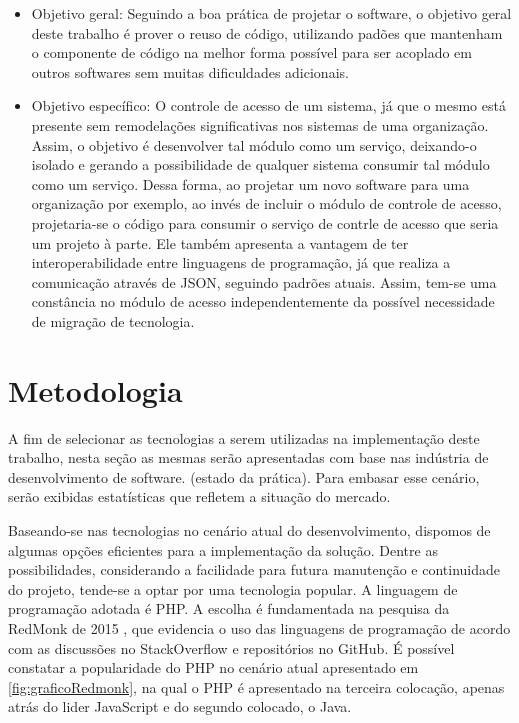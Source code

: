 \begin{itemize}
	\item Objetivo geral: Seguindo a boa prática de projetar o software, o objetivo geral deste trabalho é prover o reuso de código, utilizando padões que mantenham o componente de código na melhor forma possível para ser acoplado em outros softwares sem muitas dificuldades adicionais.
	\item Objetivo específico: O controle de acesso de um sistema, já que o mesmo está presente sem remodelações significativas nos sistemas de uma organização. Assim, o objetivo é desenvolver tal módulo como um serviço, deixando-o isolado e gerando a possibilidade de qualquer sistema consumir tal módulo como um serviço. Dessa forma, ao projetar um novo software para uma organização por exemplo, ao invés de incluir o módulo de controle de acesso, projetaria-se o código para consumir o serviço de contrle de acesso que seria um projeto à parte. Ele também apresenta a vantagem de ter interoperabilidade entre linguagens de programação, já que realiza a comunicação através de JSON, seguindo padrões atuais. Assim, tem-se uma constância no módulo de acesso independentemente da possível necessidade de migração de tecnologia.
\end{itemize}


\section{Metodologia}

A fim de selecionar as tecnologias a serem utilizadas na implementação deste trabalho, nesta seção as mesmas serão apresentadas com base nas indústria de desenvolvimento de software. (estado da prática). Para embasar esse cenário, serão exibidas estatísticas que refletem a situação do mercado.

Baseando-se nas tecnologias no cenário atual do desenvolvimento, dispomos de algumas opções eficientes para a implementação da solução. Dentre as possibilidades, considerando a facilidade para futura manutenção e continuidade do projeto, tende-se a optar por uma tecnologia popular. A linguagem de programação adotada é PHP. A escolha é fundamentada na pesquisa da RedMonk de 2015 \cite{Grafico-RedMonk} , que evidencia o uso das linguagens de programação de acordo com as discussões no StackOverflow e repositórios no GitHub. É possível constatar a popularidade do PHP no cenário atual apresentado em \ref{fig:graficoRedmonk}, na qual o PHP é apresentado na terceira colocação, apenas atrás do lider JavaScript e do segundo colocado, o Java.


